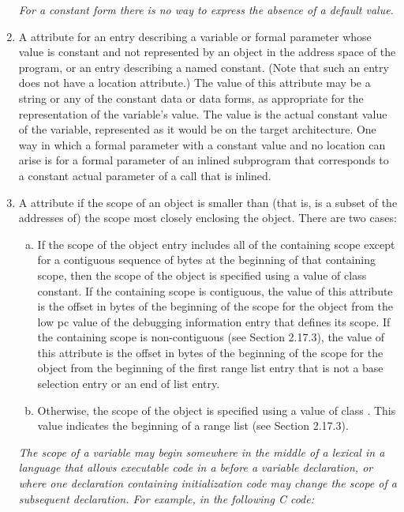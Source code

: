 \begin{enumerate}[1.]
\textit{For a constant form there is no way to 
express the absence of a default value.}

\item A  attribute for an entry describing a
variable or formal parameter whose value is constant and not
represented by an object in the address space of the program,
or an entry describing a named constant. (Note that such
an entry does not have a location attribute.) The value of
this attribute may be a string or any of the constant data
or data  forms, 
as appropriate for the representation
of the variable’s value. The value is the actual constant
value of the variable, represented as it would be on the
target architecture.  One way in which a formal parameter
with a constant value and no location can arise is for a
formal parameter of an inlined subprogram that corresponds
to a constant actual parameter of a call that is inlined.

\item A  attribute if the scope of an
object is smaller than (that is, is a subset of the addresses
of) the scope most closely enclosing the object. There are
two cases:
\begin{enumerate}[a)]
\item If the scope of the object entry includes all of the
containing scope except for a contiguous sequence of bytes at
the beginning of that containing scope, then the scope of the
object is specified using a value of class constant. If the
containing scope is contiguous, the value of this attribute
is the offset in bytes of the beginning of the scope for the
object from the low pc value of the debugging information
entry that defines its scope. If the containing scope
is non-contiguous (see Section 2.17.3), the value of this
attribute is the offset in bytes of the beginning of the scope
for the object from the beginning of the first range list entry
that is not a base selection entry or an end of list entry.

\item Otherwise, the scope of the object is specified using
a value of class . This value indicates the
beginning of a range list (see Section 2.17.3).
\end{enumerate}


\textit{The scope of a variable may begin somewhere in the middle of
a lexical  in a language that allows executable code in a
 before a variable declaration, or where one declaration
containing initialization code may change the scope of a
subsequent declaration.  For example, in the following C code:}


\end{enumerate}
